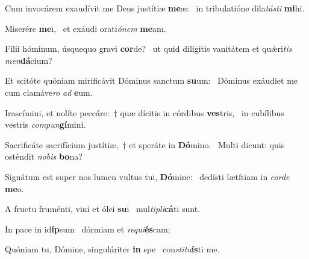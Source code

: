 \item Cum invocárem exaudívit me Deus justítiæ \textbf{me}æ:~\psstar{} in tribulatióne dila\textit{tásti} \textbf{mi}hi.
\item Miserére \textbf{me}i,~\psstar{} et exáudi orati\textit{ónem} \textbf{me}am.
\item Fílii hóminum, úsquequo gravi \textbf{cor}de?~\psstar{} ut quid dilígitis vanitátem et quǽri\textit{tis} \textit{men}\textbf{dá}cium?
\item Et scitóte quóniam mirificávit Dóminus sanctum \textbf{su}um:~\psstar{} Dóminus exáudiet me cum clamáve\textit{ro} \textit{ad} \textbf{e}um.
\item Irascímini, et nolíte peccáre:~† quæ dícitis in córdibus \textbf{ves}tris,~\psstar{} in cubílibus vestris \textit{compun}\textbf{gí}mini.
\item Sacrificáte sacrifícium justítiæ,~† et speráte in \textbf{Dó}mino.~\psstar{} Multi dicunt: quis osténdit \textit{nobis} \textbf{bo}na?
\item Signátum est super nos lumen vultus tui, \textbf{Dó}mine:~\psstar{} dedísti lætítiam in \textit{corde} \textbf{me}o.
\item A fructu fruménti, vini et ólei \textbf{su}i~\psstar{} mul\textit{tipli}\textbf{cá}ti sunt.
\item In pace in id\textbf{íp}sum~\psstar{} dórmiam et \textit{requi}\textbf{és}cam;
\item Quóniam tu, Dómine, singuláriter \textbf{in} spe~\psstar{} con\textit{stitu}\textbf{ís}ti me.
